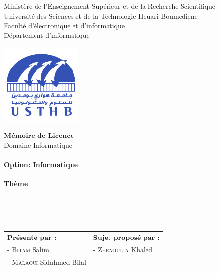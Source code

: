 
\begin{center}
    \normalsize{Ministère de l'Enseignement Supérieur et de la Recherche Scientifique}\\
    \normalsize{Université des Sciences et de la Technologie Houari Boumediene}\\
    \normalsize{Faculté d'électronique et d'informatique}\\
    \normalsize{Département d'informatique}\\
    \end{center}
    \begin{center}
    \includegraphics[width=4cm,height=4cm]{images/USTHB_Logo.png}
    \end{center}


    \begin{center}
    \Huge{\textbf{Mémoire de Licence}}\\
    \large{Domaine Informatique}\\
    \textbf{}\\
    \large{\textbf{Option: Informatique}}\\
    \textbf{}\\
    \bigskip
    \normalsize{\textbf{Thème}}
    \end{center}
\\
\\
\\
\begin{table}[h]
    \center
    \begin{tabular}{p{8cm}p{6.5cm}}
    \textbf{Présenté par :} & \textbf{Sujet proposé par :}\\
    - \textsc{Bitam} Salim  & - \textsc{Zeraoulia} Khaled \\
    - \textsc{Malaoui} Sidahmed Bilal  & \\
    \end{tabular}
\end{table}
\\
\\


